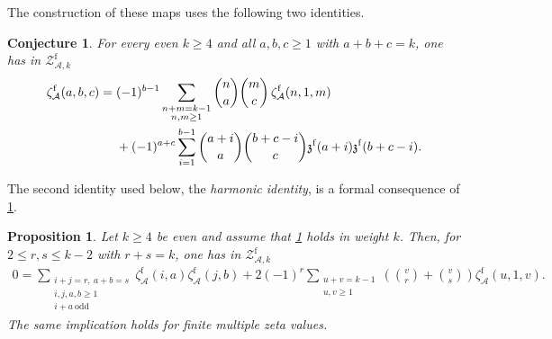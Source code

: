 \documentclass[12pt]{amsart}
\numberwithin{equation}{section}
\theoremstyle{plain}
\newtheorem{prop}[prop]{Proposition}
\newtheorem{conj}[conj]{Conjecture}
\newcommand{\ZAfw}[1]{{\mathcal Z_{\mathcal A,#1}^{\mathrm f}}}
\newcommand{\zaf}[1]{\zeta_{\mathcal A}^{\mathrm f}(#1)}
\newcommand{\zzf}[1]{\mathfrak z^{\mathrm f}(#1)}
\begin{document}
The construction of these maps uses the following two identities.

\begin{conj}\label{conj:beta-identities}
For every even $k\geq4$ and all $a,b,c\geq1$ with $a+b+c=k$, one has
in $\ZAfw{k}$
\begin{align}\label{eq:formal-Hoffman-depth-three}
 \zaf{a,b,c}
={}&(-1)^{b-1}
 \sum_{\substack{n+m=k-1\\n,m\geq1}}
 \binom na\binom mc\,\zaf{n,1,m}\notag\\
&+(-1)^{a+c}\sum_{i=1}^{b-1}
 \binom{a+i}{a}\binom{b+c-i}{c}
 \zzf{a+i}\zzf{b+c-i}.
\end{align}
\end{conj}

The second identity used below, the \emph{harmonic identity}, is a
formal consequence of \cref{conj:beta-identities}.

\begin{prop}\label{prop:harmonic-from-hoffman}
Let $k\geq4$ be even and assume that \cref{conj:beta-identities} holds
in weight $k$. Then, for $2\leq r,s\leq k-2$ with $r+s=k$, one has in
$\ZAfw{k}$
\begin{align}\label{eq:formal-harmonic}
0=
 \sum_{\substack{i+j=r,\ a+b=s\\i,j,a,b\geq1\\i+a\ \mathrm{odd}}}
 \zaf{i,a}\zaf{j,b}
 +2(-1)^r\sum_{\substack{u+v=k-1\\u,v\geq1}}
 \left(\binom vr+\binom vs\right)\zaf{u,1,v}.
\end{align}
The same implication holds for finite multiple zeta values.
\end{prop}
\end{document}
